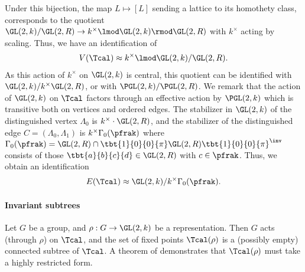 \documentclass[draft]{article}
\begin{document}
Under this bijection, the map $L\mapsto [L]$ sending a lattice to its homothety class, corresponds to the quotient $\GL(2,k) / \GL(2,R) \to k^\times \lmod \GL(2,k) \rmod \GL(2,R)$ with $k^\times$ acting by scaling. Thus, we have an identification of 
\begin{align*}
	V(\Tcal) \approx k^\times \lmod \GL(2,k)/\GL(2,R).
\end{align*} 
As this action of $k^\times$ on $\GL(2,k)$ is central, this quotient can be identified with $\GL(2,k)/k^\times\GL(2,R)$, or with $\PGL(2,k)/\PGL(2,R)$. We remark that the action of $\GL(2,k)$ on $\Tcal$ factors through an effective action by $\PGL(2,k)$ which is transitive both on vertices and ordered edges. The stabilizer in $\GL(2,k)$ of the distinguished vertex $\Lambda_0$ is $k^\times \cdot \GL(2,R)$, and the stabilizer of the distinguished edge $C = (\Lambda_0,\Lambda_1)$ is $k^\times \Gamma_0(\pfrak)$ where $\Gamma_0(\pfrak)=\GL(2,R)\cap \tbt{1}{0}{0}{\pi}\GL(2,R)\tbt{1}{0}{0}{\pi}^\inv$ consists of those $\tbt{a}{b}{c}{d} \in \GL(2,R)$  with $c \in \pfrak$. Thus, we obtain an identification 
\begin{align*}
    E(\Tcal)\approx  \GL(2,k) / k^\times \Gamma_0(\pfrak). 
\end{align*}

\paragraph*{Invariant subtrees}
Let $G$ be a group, and $\rho: G \to \GL(2,k)$ be a representation. Then $G$ acts (through $\rho$) on $\Tcal$, and the set of fixed points $\Tcal(\rho)$ is a (possibly empty) connected subtree of $\Tcal$.  A theorem of \cite{bellaicheSousgroupesGLArbres2014} demonstrates that $\Tcal(\rho)$ must take a highly restricted form. 


 
\end{document}

